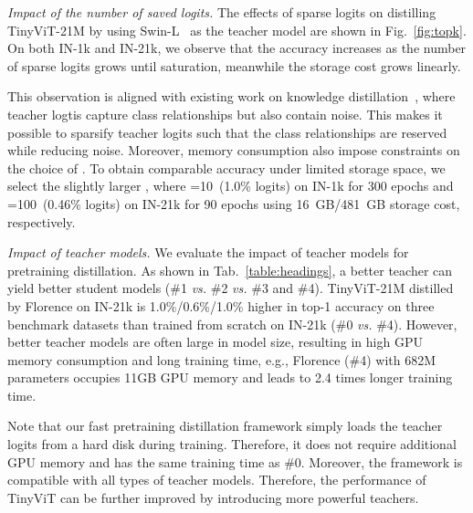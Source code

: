 \documentclass[runningheads]{llncs}
\newcommand\REV[1]{#1}
\begin{document}
\textit{Impact of the number of saved logits.}
The effects of sparse logits on distilling TinyViT-21M by using Swin-L~\cite{swin} as the teacher model are shown in Fig.~\ref{fig:topk}.
On both IN-1k and IN-21k, \REV{we observe that the accuracy increases as the number of sparse logits  grows until saturation, meanwhile the storage cost grows linearly.}

This observation is aligned with existing work on knowledge distillation~\cite{understandKD,fkd}, where teacher logtis capture class relationships but also contain noise.
This makes it possible to sparsify teacher logits such that the class relationships are reserved while reducing noise.
Moreover, memory consumption also impose constraints on the choice of .
\REV{To obtain comparable accuracy under limited storage space, we select the slightly larger , where =10~(1.0\% logits) on IN-1k for 300 epochs and =100~(0.46\% logits) on IN-21k for 90 epochs using 16~GB/481~GB storage cost, respectively.}

\textit{Impact of teacher models.}
We evaluate the impact of teacher models for pretraining distillation.
As shown in Tab.~\ref{table:headings}, a better teacher can yield better student models (\#1 \emph{vs.} \#2 \emph{vs.} \#3 and \#4).
TinyViT-21M distilled by Florence on IN-21k is 1.0\%/0.6\%/1.0\% higher in top-1 accuracy on three benchmark datasets than trained from scratch on IN-21k (\#0 \emph{vs.} \#4). 
However, better teacher models are often large in model size, resulting in high GPU memory consumption and long training time, e.g., Florence (\#4) with 682M parameters occupies 11GB GPU memory and leads to 2.4 times longer training time.

Note that our fast pretraining distillation framework simply loads the teacher logits from a hard disk during training. Therefore, it does not require additional GPU memory and has the same training time as \#0.  Moreover, the framework is compatible with all types of teacher models. Therefore, the performance of TinyViT can be further improved by introducing more powerful teachers.
\end{document}

